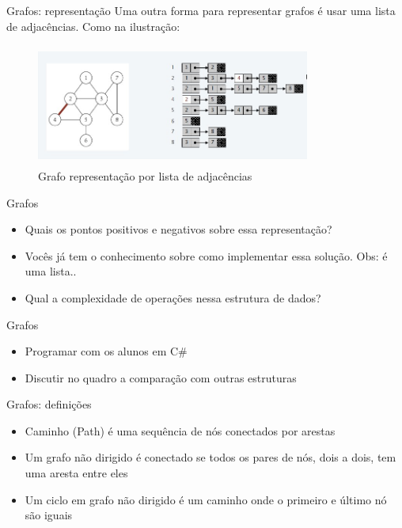 \begin{frame}
	\begin{block}{Grafos: representação}
		Uma outra forma para representar grafos é usar uma lista de adjacências.  Como na ilustração:
		\begin{figure}[!htb]
			\centering	  				
			\includegraphics[height=4cm, width = 9cm]{./pic/listaAdjacencia.jpg}
			\caption{Grafo representação por lista de adjacências \cite{GEEKS_2018}}
		\end{figure}
	\end{block}
\end{frame}

\begin{frame}
	\begin{block}{Grafos}
		\begin{itemize}
			\item Quais os pontos positivos e negativos sobre essa representação?	
			\item Vocês já tem o conhecimento sobre como implementar essa solução. Obs: é uma lista..	
			\item Qual a complexidade de operações nessa estrutura de dados?
		\end{itemize}
	\end{block}
\end{frame}

\begin{frame}
	\begin{block}{Grafos}
		\begin{itemize}
			\item Programar com os alunos em C\#
			\item Discutir no quadro a comparação com outras estruturas
		\end{itemize}
	\end{block}
\end{frame}

\begin{frame}
	\begin{block}{Grafos: definições}
		\begin{itemize}
			\item Caminho (Path) é uma sequência de nós conectados por arestas	
			\item Um grafo não dirigido é conectado se todos os pares de nós, dois a dois, tem uma aresta entre eles	
			\item Um ciclo em grafo não dirigido é um caminho onde o primeiro e último nó são iguais
		\end{itemize}
	\end{block}
\end{frame}

